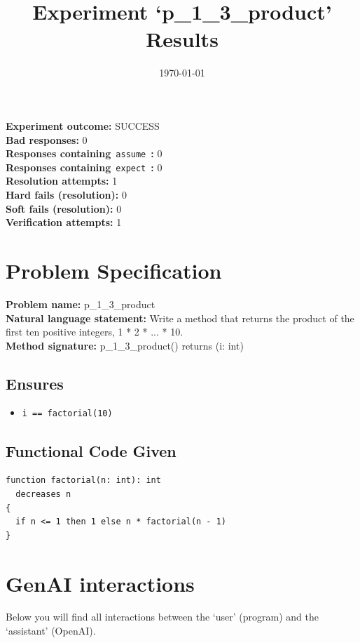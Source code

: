 \documentclass{article}
\begin{document}
\title{Experiment `p\_1\_3\_product' Results}
\author{\today}
\date{}
\maketitle
\textbf{Experiment outcome: }SUCCESS
\\\textbf{Bad responses: }0
\\\textbf{Responses containing}~\texttt{assume}~\textbf{: }0
\\\textbf{Responses containing}~\texttt{expect}~\textbf{: }0
\\\textbf{Resolution attempts: }1
\\\textbf{Hard fails (resolution): }0
\\\textbf{Soft fails (resolution): }0
\\\textbf{Verification attempts: }1
\section*{Problem Specification}
\textbf{Problem name: }p\_1\_3\_product
\\\textbf{Natural language statement: }Write a method that returns the product of the first ten positive integers, 1 * 2 * ... * 10.
\\\textbf{Method signature: }p\_1\_3\_product() returns (i: int)
\subsection*{Ensures}
\begin{itemize}
\item \texttt{i == factorial(10)}
\end{itemize}
\subsection*{Functional Code Given}
\begin{lstlisting}
function factorial(n: int): int
  decreases n
{
  if n <= 1 then 1 else n * factorial(n - 1)
}
\end{lstlisting}
\clearpage
\section*{GenAI interactions}
Below you will find all interactions between the `user' (program) and the `assistant' (OpenAI).
\end{document}
